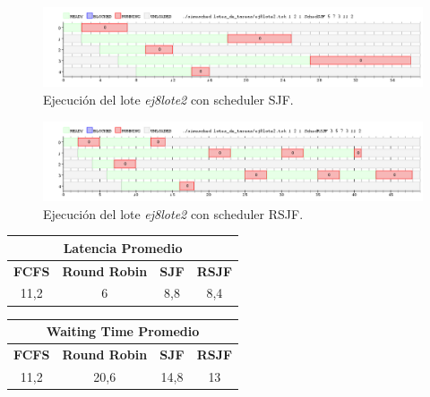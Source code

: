 \begin{figure}[!h]
	\begin{center}
		\includegraphics[width=500px]{imagenes/ej8_prueba2_sjf.png}
		\caption{Ejecución del lote \emph{ej8lote2} con scheduler SJF.}
		\label{fig:grafico_ej8_prueba2_sjf}
	\end{center}
\end{figure}

\newpage

\begin{figure}[!h]
	\begin{center}
		\includegraphics[width=500px]{imagenes/ej8_prueba2_rsjf.png}
		\caption{Ejecución del lote \emph{ej8lote2} con scheduler RSJF.}
		\label{fig:grafico_ej8_prueba2_rsjf}
	\end{center}
\end{figure}

\begin{center}
	\begin{tabular}{|c|c|c|c|}
		\hline
		\multicolumn{4}{|c|}{\large{\textbf{Latencia Promedio}}} \\
		\hline
		\textbf{FCFS} & \textbf{Round Robin} & \textbf{SJF} & \textbf{RSJF} \\
		\hline
		11,2 & 6 & 8,8 & 8,4 \\
		\hline
	\end{tabular}
\end{center}

\begin{center}
	\begin{tabular}{|c|c|c|c|}
		\hline
		\multicolumn{4}{|c|}{\large{\textbf{Waiting Time Promedio}}} \\
		\hline
		\textbf{FCFS} & \textbf{Round Robin} & \textbf{SJF} & \textbf{RSJF} \\
		\hline
		11,2 & 20,6 & 14,8 & 13 \\
		\hline
	\end{tabular}
\end{center}

